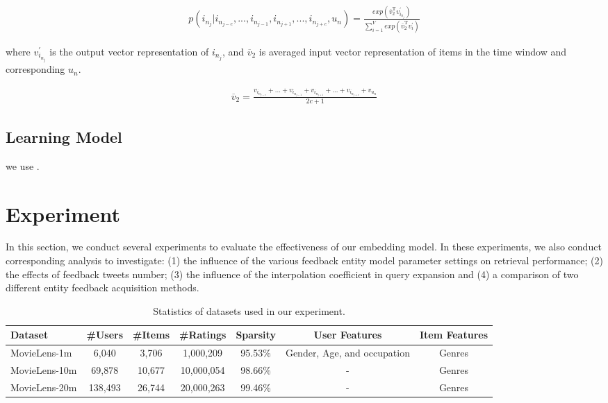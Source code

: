 \documentclass{sig-alternate-05-2015}
\begin{document}
\begin{equation}
\begin{aligned}
	p(i_{n_j} | i_{n_{j-c}}, ..., i_{n_{j-1}}, i_{n_{j+1}},..., i_{n_{j+c}}, u_n) =
	\frac
	{
		exp( \overline{v}_{2}^{\mathrm{T}} v_{i_{n_j}}^{'} )
	}
	{
		\sum_{i=1}^{V} exp( \overline{v}_{2}^{\mathrm{T}} v_{i}^{'} )
	}
\end{aligned}
\end{equation}

where $v_{i_{n_j}}^{'}$ is the output vector representation of $i_{n_j}$,
and $\overline{v}_{2}$ is averaged input vector representation of items in the time window
and corresponding $u_n$.

\begin{equation}
\begin{aligned}
	\overline{v}_{2} = \frac{ v_{i_{n_{j-c}}} + ... + v_{i_{n_{j-1}}} + 
	v_{i_{n_{j+1}}} + ... + v_{i_{n_{j+c}}} + v_{u_n} }{2c+1}
\end{aligned}
\end{equation}




\subsection{Learning Model}
we use \cite{chen2012svdfeature}.


\section{Experiment}
In this section, we conduct several experiments to evaluate the effectiveness of our embedding model.
In these experiments, we also conduct corresponding analysis to investigate:
(1) the influence of the various feedback entity model parameter settings on
retrieval performance;
(2) the effects of feedback tweets number;
(3) the influence of the interpolation coefficient in query expansion and
(4) a comparison of two different entity feedback acquisition methods.



\begin{table}[htpb]
	\centering
	\caption{Statistics of datasets used in our experiment.}
	\label{tab:topics}
	\begin{tabular}{|l|c|c|c|c|c|c|}
		\hline
		\textbf{Dataset} & \textbf{\#Users} & \textbf{\#Items} & \textbf{\#Ratings} & \textbf{Sparsity} & \textbf{User Features} & \textbf{Item Features} \\
		\hline
		MovieLens-1m  & 6,040   & 3,706  & 1,000,209  & 95.53\% & Gender, Age, and occupation & Genres \\
		MovieLens-10m & 69,878  & 10,677 & 10,000,054 & 98.66\% & - & Genres \\
		MovieLens-20m & 138,493 & 26,744 & 20,000,263 & 99.46\% & - & Genres \\
		\hline
	\end{tabular}
\end{table}
\end{document}
